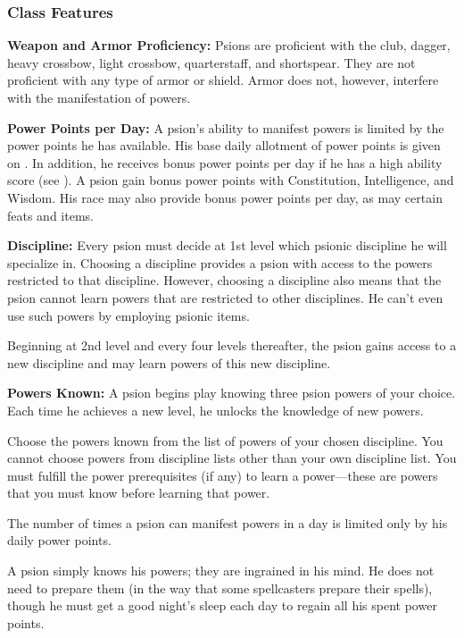 \subsubsection{Class Features}

\textbf{Weapon and Armor Proficiency:} Psions are proficient with the club, dagger, heavy crossbow, light crossbow, quarterstaff, and shortspear. They are not proficient with any type of armor or shield. Armor does not, however, interfere with the manifestation of powers.

\textbf{Power Points per Day:} A psion's ability to manifest powers is limited by the power points he has available. His base daily allotment of power points is given on . In addition, he receives bonus power points per day if he has a high ability score (see ). A psion gain bonus power points with Constitution, Intelligence, and Wisdom. His race may also provide bonus power points per day, as may certain feats and items.

\textbf{Discipline:} Every psion must decide at 1st level which psionic discipline he will specialize in. Choosing a discipline provides a psion with access to the powers restricted to that discipline. However, choosing a discipline also means that the psion cannot learn powers that are restricted to other disciplines. He can't even use such powers by employing psionic items.

Beginning at 2nd level and every four levels thereafter, the psion gains access to a new discipline and may learn powers of this new discipline.

\textbf{Powers Known:} A psion begins play knowing three psion powers of your choice. Each time he achieves a new level, he unlocks the knowledge of new powers.

Choose the powers known from the list of powers of your chosen discipline. You cannot choose powers from discipline lists other than your own discipline list. You must fulfill the power prerequisites (if any) to learn a power---these are powers that you must know before learning that power.

The number of times a psion can manifest powers in a day is limited only by his daily power points.

A psion simply knows his powers; they are ingrained in his mind. He does not need to prepare them (in the way that some spellcasters prepare their spells), though he must get a good night's sleep each day to regain all his spent power points.

